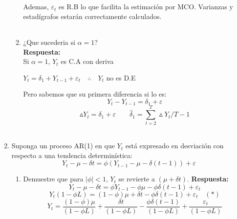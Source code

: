 \documentclass[12pt,letterpaper]{article}
\begin{document}
\begin{enumerate}
\begin{enumerate}
    \\
    \\
    Ademas, $\varepsilon_{t}$ es R.B lo que facilita la estimación por MCO. Varianzas y estadígrafos estarán correctamente calculados.
    \\
    \\
   \item ¿Que sucederia si $\alpha=1$?
    \\
    \textbf{Respuesta:}
    \\
    Si $\alpha=1$, $Y_{t}$ es C.A con deriva
    \begin{center}
       $Y_{t}=\delta_{1}+Y_{t-1}+\varepsilon_{t} \quad \therefore \quad Y_{t}$ no es D.E
    \end{center}
    Pero sabemos que su primera diferencia si lo es:
    \begin{equation*}
       Y_{t}-Y_{t-1}=\delta_{1}+\varepsilon
    \end{equation*}
    \begin{equation*}
       \vartriangle Y_{t}=\delta_{1}+\varepsilon \quad \quad \hat{\delta}_{1}=\sum_{t=2}^{T}\vartriangle Y_{t}/T-1
    \end{equation*}
    \\
    \end{enumerate}
\item Suponga un proceso AR(1) en que $Y_{t}$ está expresado en desviación con respecto a una tendencia determinística:
    \begin{equation*}
        Y_{t}-\mu-\delta t=\phi(Y_{t-1}-\mu-\delta(t-1))+\varepsilon
    \end{equation*}
    \begin{enumerate}
        \item Demuestre que para $|\phi|<1$, $Y_{t}$ se revierte a $(\mu+\delta t)$.
        \newline
        \textbf{Respuesta:}
        \begin{equation*}
            Y_{t}-\mu-\delta t=\phi Y_{t-1}-\phi \mu-\phi\delta(t-1)+\varepsilon_{t}
        \end{equation*}
        \begin{equation*}
            Y_{t}(1-\phi L)=(1-\phi)\mu+\delta t-\phi\delta(t-1)+\varepsilon_{t}\quad (*)
        \end{equation*}
        \begin{equation*}
            Y_{t}=\frac{(1-\phi)\mu}{(1-\phi L)}+\frac{\delta t}{(1-\phi L)}-\frac{\phi\delta(t-1)}{(1-\phi L)}+\frac{\varepsilon_{t}}{(1-\phi L)}

\end{equation*}
\end{enumerate}
\end{enumerate}
\end{document}
